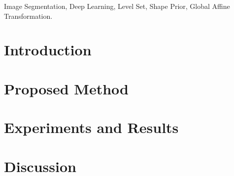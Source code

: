 \documentclass[journal]{IEEEtran}
\begin{document}


\maketitle

\begin{abstract}

\end{abstract}\label{Abstract}

\begin{IEEEkeywords}
Image Segmentation, Deep Learning, Level Set, Shape Prior, Global Affine Transformation.
\end{IEEEkeywords}


%
\IEEEpeerreviewmaketitle



\section{Introduction}\label{sec:Introduction}



\section{Proposed Method}\label{sec:Propsed Work}



\section{Experiments and Results}\label{sec:Experiments and Results}



\section{Discussion}\label{sec:Discussion}

\end{document}
